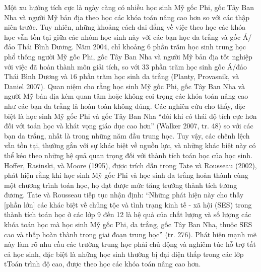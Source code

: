 \documentclass[
  10pt,
  a4paper,
  landscape,
  twoside,
  openany
]{scrbook}
\newcommand{\VI}[1]{#1}
\newcommand{\NOTE}[1]{#1}
\begin{document}
{
\VI{Một xu hướng tích cực là ngày càng có nhiều học sinh Mỹ gốc Phi, gốc Tây Ban Nha và người Mỹ bản địa theo học các khóa toán nâng cao hơn so với các thập niên trước. Tuy nhiên, những khoảng cách dai dẳng về việc theo học các khóa học vẫn tồn tại giữa các nhóm học sinh này với các bạn học da trắng và gốc Á/đảo Thái Bình Dương. Năm 2004, chỉ khoảng $6$ phần trăm học sinh trung học phổ thông người Mỹ gốc Phi, gốc Tây Ban Nha và người Mỹ bản địa tốt nghiệp với việc đã hoàn thành môn giải tích, so với $33$ phần trăm học sinh gốc Á/đảo Thái Bình Dương và $16$ phần trăm học sinh da trắng (Planty, Provasnik, và Daniel 2007). Quan niệm cho rằng học sinh Mỹ gốc Phi, gốc Tây Ban Nha và người Mỹ bản địa kém quan tâm hoặc không coi trọng các khóa toán nâng cao như các bạn da trắng là hoàn toàn không đúng. Các nghiên cứu cho thấy, đặc biệt là học sinh Mỹ gốc Phi và gốc Tây Ban Nha “đôi khi có thái độ tích cực hơn đối với toán học và khát vọng giáo dục cao hơn” (Walker 2007, tr. 48) so với các bạn da trắng, nhất là trong những năm đầu trung học. Tuy vậy, các chênh lệch vẫn tồn tại, thường gắn với sự khác biệt về nguồn lực, và những khác biệt này có thể kéo theo những hệ quả quan trọng đối với thành tích toán học của học sinh. Hoffer, Rasinski, và Moore (1995), được trích dẫn trong Tate và Rousseau (2002), phát hiện rằng khi học sinh Mỹ gốc Phi và học sinh da trắng hoàn thành cùng một chương trình toán học, họ đạt được mức tăng trưởng thành tích tương đương. Tate và Rousseau tiếp tục nhận định: ``Những phát hiện này cho thấy [phần lớn] các khác biệt về chủng tộc và tình trạng kinh tế - xã hội (SES) trong thành tích toán học ở các lớp 9 đến 12 là hệ quả của chất lượng và số lượng các khóa toán học mà học sinh Mỹ gốc Phi, da trắng, gốc Tây Ban Nha, thuộc SES cao và thấp hoàn thành trong giai đoạn trung học'' (tr. 276). Phát hiện mạnh mẽ này làm rõ nhu cầu các trường trung học phải chủ động và nghiêm túc hỗ trợ tất cả học sinh, đặc biệt là những học sinh thường bị đại diện thấp trong các lớp tToán trình độ cao, được theo học các khóa toán nâng cao hơn.}
}
{
\NOTE{}
}
\end{document}
